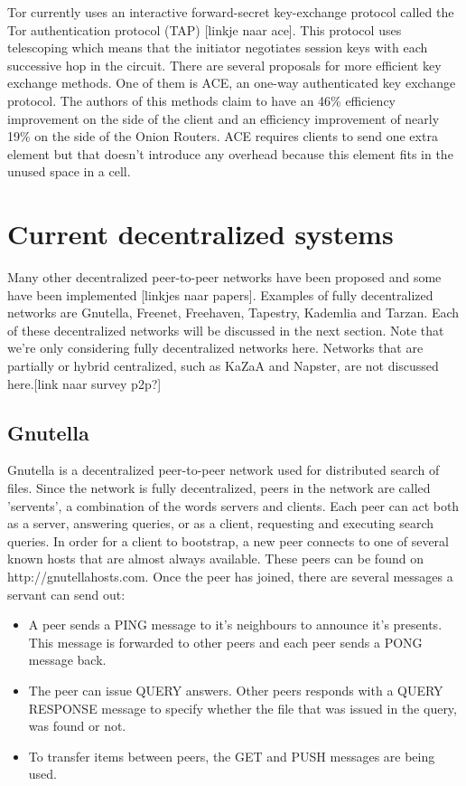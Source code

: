 \documentclass[journal]{IEEEtran}
\begin{document}
		Tor currently uses an interactive forward-secret key-exchange protocol called the Tor authentication protocol (TAP) [linkje naar ace]. This protocol uses telescoping which means that the initiator negotiates session keys with each successive hop in the circuit. There are several proposals for more efficient key exchange methods. One of them is ACE, an one-way authenticated key exchange protocol. The authors of this methods claim to have an 46\% efficiency improvement on the side of the client and an efficiency improvement of nearly 19\% on the side of the Onion Routers. ACE requires clients to send one extra element but that doesn't introduce any overhead because this element fits in the unused space in a cell.

	\section{Current decentralized systems}
		Many other decentralized peer-to-peer networks have been proposed and some have been implemented [linkjes naar papers]. Examples of fully decentralized networks are Gnutella, Freenet, Freehaven, Tapestry, Kademlia and Tarzan. Each of these decentralized networks will be discussed in the next section. Note that we're only considering fully decentralized networks here. Networks that are partially or hybrid centralized, such as KaZaA and Napster, are not discussed here.[link naar survey p2p?]
	
		\subsection{Gnutella}
			Gnutella is a decentralized peer-to-peer network used for distributed search of files. Since the network is fully decentralized, peers in the network are called 'servents', a combination of the words servers and clients. Each peer can act both as a server, answering queries, or as a client, requesting and executing search queries. In order for a client to bootstrap, a new peer connects to one of several known hosts that are almost always available. These peers can be found on http://gnutellahosts.com. Once the peer has joined, there are several messages a servant can send out:
		
			\begin{itemize}
				\item A peer sends a PING message to it's neighbours to announce it's presents. This message is forwarded to other peers and each peer sends a PONG message back.
				\item The peer can issue QUERY answers. Other peers responds with a QUERY RESPONSE message to specify whether the file that was issued in the query, was found or not.
				\item To transfer items between peers, the GET and PUSH messages are being used.
			\end{itemize}
			
\end{document}
